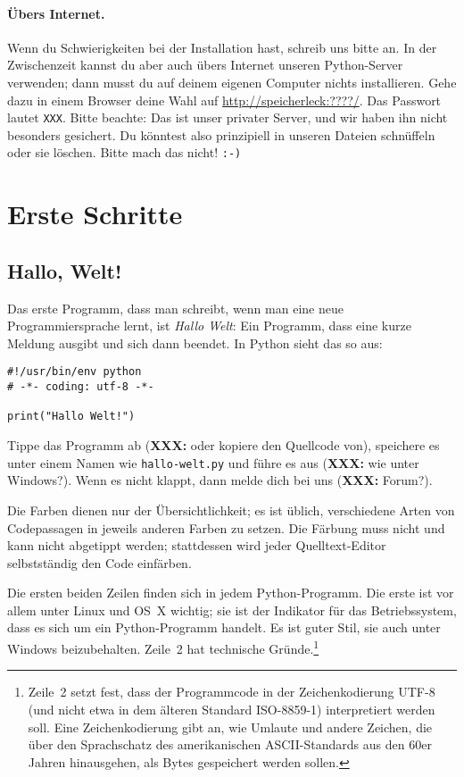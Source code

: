 \documentclass{blatt}
\newcommand{\XXX}[1]{\textbf{XXX:} #1}
\begin{document}
\paragraph{Übers Internet.} Wenn du Schwierigkeiten bei der Installation hast,
schreib uns bitte an. In der Zwischenzeit kannst du aber auch übers Internet
unseren Python-Server verwenden; dann musst du auf deinem eigenen Computer
nichts installieren. Gehe dazu in einem Browser deine Wahl auf
\url{http://speicherleck:????/}. Das Passwort lautet \texttt{XXX}. Bitte
beachte: Das ist unser privater Server, und wir haben ihn nicht besonders
gesichert. Du könntest also prinzipiell in unseren Dateien schnüffeln oder sie
löschen. Bitte mach das nicht! \texttt{:-)}


\section{Erste Schritte}

\subsection{Hallo, Welt!}

Das erste Programm, dass man schreibt, wenn man eine neue Programmiersprache
lernt, ist \emph{Hallo Welt}: Ein Programm, dass eine kurze Meldung ausgibt
und sich dann beendet. In Python sieht das so aus:

\begin{verbatim}
#!/usr/bin/env python
# -*- coding: utf-8 -*-

print("Hallo Welt!")
\end{verbatim}

Tippe das Programm ab (\XXX{oder kopiere den Quellcode von}), speichere es unter
einem Namen wie \texttt{hallo-welt.py} und führe es aus (\XXX{wie unter Windows?}).
Wenn es nicht klappt, dann melde dich bei uns (\XXX{Forum?}).

Die Farben dienen nur der Übersichtlichkeit; es ist üblich, verschiedene Arten
von Codepassagen in jeweils anderen Farben zu setzen. Die Färbung muss nicht
und kann nicht abgetippt werden; stattdessen wird jeder Quelltext-Editor
selbstständig den Code einfärben.

Die ersten beiden Zeilen finden sich in jedem Python-Programm. Die erste ist
vor allem unter Linux und OS~X wichtig; sie ist der Indikator für das
Betriebssystem, dass es sich um ein Python-Programm handelt. Es ist guter Stil,
sie auch unter Windows beizubehalten. Zeile~2 hat technische
Gründe.\footnote{Zeile~2 setzt fest, dass der Programmcode in der
Zeichenkodierung UTF-8 (und nicht etwa in dem älteren Standard ISO-8859-1)
interpretiert werden soll. Eine Zeichenkodierung gibt an, wie Umlaute und
andere Zeichen, die über den Sprachschatz des amerikanischen ASCII-Standards
aus den 60er Jahren hinausgehen, als Bytes gespeichert werden sollen.}
\end{document}
